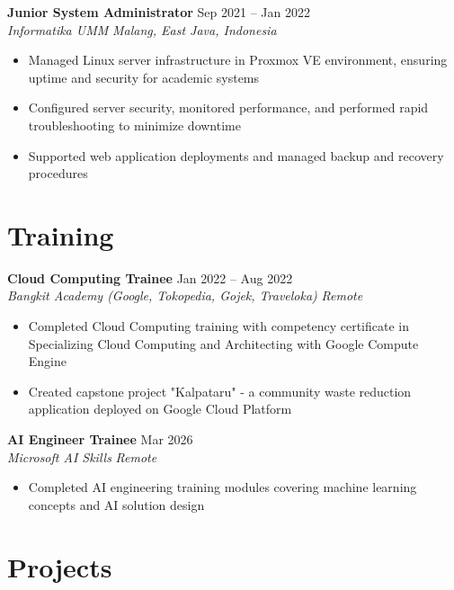 \documentclass[11pt,a4paper]{article}
\newcommand{\jobentry}[4]{%
    \vspace{1pt}
    \textbf{#1} \hfill {#2} \\
    \textit{#3} \hfill \textit{#4}
}
\newcommand{\trainingentry}[4]{%
    \vspace{1pt}
    \textbf{#1} \hfill {#2} \\
    \textit{#3} \hfill \textit{#4}
}
\begin{document}
\vspace{3pt}

\jobentry{Junior System Administrator}{Sep 2021 -- Jan 2022}
{Informatika UMM}{Malang, East Java, Indonesia}
\begin{itemize}[leftmargin=*,nosep,topsep=2pt,itemsep=0.5pt]
    \item Managed Linux server infrastructure in Proxmox VE environment, ensuring uptime and security for academic systems
    \item Configured server security, monitored performance, and performed rapid troubleshooting to minimize downtime
    \item Supported web application deployments and managed backup and recovery procedures
\end{itemize}

\section*{Training}

\trainingentry{Cloud Computing Trainee}{Jan 2022 -- Aug 2022}
{Bangkit Academy (Google, Tokopedia, Gojek, Traveloka)}{Remote}
\begin{itemize}[leftmargin=*,nosep,topsep=2pt,itemsep=0.5pt]
    \item Completed Cloud Computing training with competency certificate in Specializing Cloud Computing and Architecting with Google Compute Engine
    \item Created capstone project "Kalpataru" - a community waste reduction application deployed on Google Cloud Platform
\end{itemize}

\vspace{3pt}

\trainingentry{AI Engineer Trainee}{Mar 2026}
{Microsoft AI Skills}{Remote}
\begin{itemize}[leftmargin=*,nosep,topsep=2pt,itemsep=0.5pt]
    \item Completed AI engineering training modules covering machine learning concepts and AI solution design
\end{itemize}

\section*{Projects}
\end{document}
